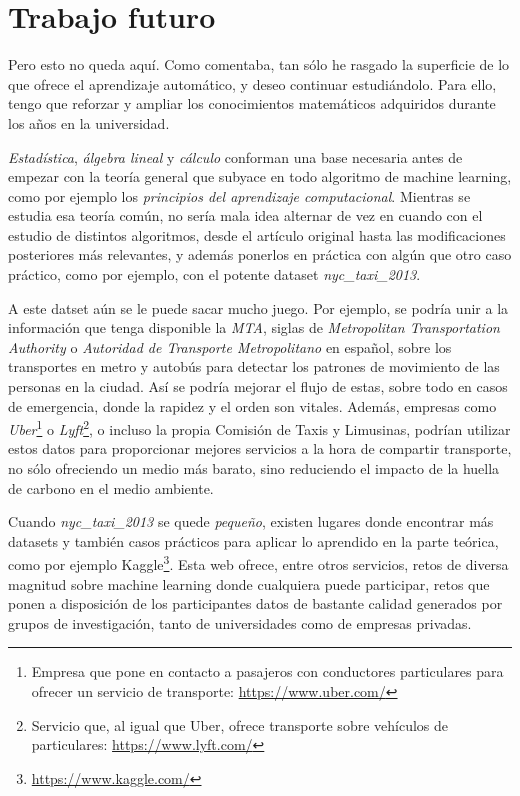 \section{Trabajo futuro} \label{sec:6.2}

Pero esto no queda aquí. Como comentaba, tan sólo he rasgado la superficie de lo que ofrece el aprendizaje automático, y deseo continuar estudiándolo. Para ello, tengo que reforzar y ampliar los conocimientos matemáticos adquiridos durante los años en la universidad.

\emph{Estadística}, \emph{álgebra lineal} y \emph{cálculo} conforman una base necesaria antes de empezar con la teoría general que subyace en todo algoritmo de machine learning, como por ejemplo los \emph{principios del aprendizaje computacional}. Mientras se estudia esa teoría común, no sería mala idea alternar de vez en cuando con el estudio de distintos algoritmos, desde el artículo original hasta las modificaciones posteriores más relevantes, y además ponerlos en práctica con algún que otro caso práctico, como por ejemplo, con el potente dataset \emph{nyc\_taxi\_2013}.

A este datset aún se le puede sacar mucho juego. Por ejemplo, se podría unir a la información que tenga disponible la \emph{MTA}, siglas de \emph{Metropolitan Transportation Authority} o \emph{Autoridad de Transporte Metropolitano} en español, sobre los transportes en metro y autobús para detectar los patrones de movimiento de las personas en la ciudad. Así se podría mejorar el flujo de estas, sobre todo en casos de emergencia, donde la rapidez y el orden son vitales. Además, empresas como \emph{Uber}\footnote{Empresa que pone en contacto a pasajeros con conductores particulares para ofrecer un servicio de transporte: \url{https://www.uber.com/}} o \emph{Lyft}\footnote{Servicio que, al igual que Uber, ofrece transporte sobre vehículos de particulares: \url{https://www.lyft.com/}}, o incluso la propia Comisión de Taxis y Limusinas, podrían utilizar estos datos para proporcionar mejores servicios a la hora de compartir transporte, no sólo ofreciendo un medio más barato, sino reduciendo el impacto de la huella de carbono en el medio ambiente.

Cuando \emph{nyc\_taxi\_2013} se quede \emph{pequeño}, existen lugares donde encontrar más datasets y también casos prácticos para aplicar lo aprendido en la parte teórica, como por ejemplo Kaggle\footnote{\url{https://www.kaggle.com/}}. Esta web ofrece, entre otros servicios, retos de diversa magnitud sobre machine learning donde cualquiera puede participar, retos que ponen a disposición de los participantes datos de bastante calidad generados por grupos de investigación, tanto de universidades como de empresas privadas.

